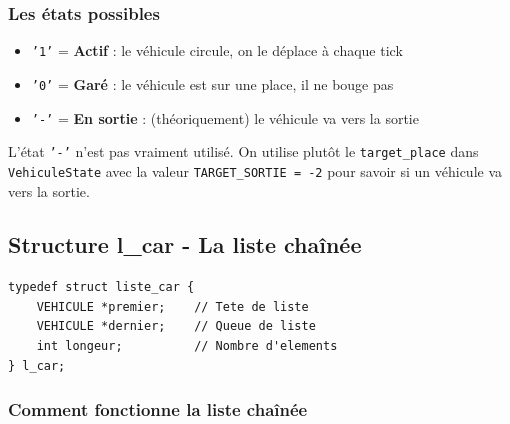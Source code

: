 \documentclass[11pt,a4paper]{article}
\newcommand{\code}[1]{\texttt{\textcolor{accent}{#1}}}
\newcommand{\variable}[1]{\texttt{\textcolor{success}{#1}}}
\begin{document}
\subsubsection{Les états possibles}

\begin{itemize}
    \item \code{'1'} = \textbf{Actif} : le véhicule circule, on le déplace à chaque tick
    \item \code{'0'} = \textbf{Garé} : le véhicule est sur une place, il ne bouge pas
    \item \code{'-'} = \textbf{En sortie} : (théoriquement) le véhicule va vers la sortie
\end{itemize}

\begin{warningbox}[En pratique]
L'état \code{'-'} n'est pas vraiment utilisé. On utilise plutôt le \variable{target\_place} dans \variable{VehiculeState} avec la valeur \code{TARGET\_SORTIE = -2} pour savoir si un véhicule va vers la sortie.
\end{warningbox}

\subsection{Structure l\_car - La liste chaînée}

\begin{codebox}[Définition]
\begin{lstlisting}
typedef struct liste_car {
    VEHICULE *premier;    // Tete de liste
    VEHICULE *dernier;    // Queue de liste
    int longeur;          // Nombre d'elements
} l_car;
\end{lstlisting}
\end{codebox}

\subsubsection{Comment fonctionne la liste chaînée}

\begin{center}
\end{center}
\end{document}
